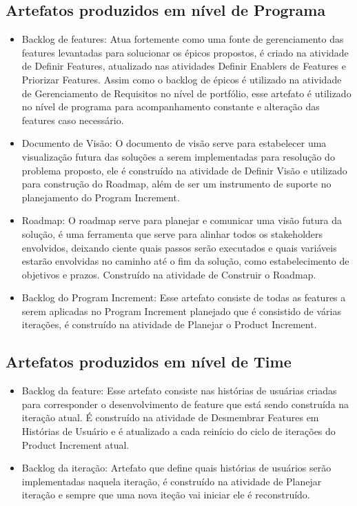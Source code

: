 \subsection{Artefatos produzidos em nível de Programa}
\begin{itemize}
\item Backlog de features: Atua fortemente como uma fonte de gerenciamento das features levantadas para solucionar os épicos propostos, é criado na atividade de Definir Features,
atualizado nas atividades Definir Enablers de Features e Priorizar Features. Assim como o backlog de épicos é utilizado na atividade de Gerenciamento de Requisitos no nível de portfólio, esse artefato é utilizado no nível de programa para acompanhamento constante e alteração das features caso necessário.

\item Documento de Visão: O documento de visão serve para estabelecer uma visualização futura das soluções a serem implementadas para resolução do problema proposto, ele é construído na atividade de Definir Visão e utilizado para construção do Roadmap, além de ser um instrumento de suporte no planejamento do Program Increment.

\item Roadmap: O roadmap serve para planejar e comunicar uma visão futura da solução, é uma ferramenta que serve para alinhar todos os stakeholders envolvidos, deixando ciente quais passos serão executados e quais variáveis estarão envolvidas no caminho até o fim da solução, como estabelecimento de objetivos e prazos. Construído na atividade de Construir o Roadmap.

\item Backlog do Program Increment: Esse artefato consiste de todas as features a serem aplicadas no Program Increment planejado que é consistido de várias iterações, é construído na atividade de Planejar o Product Increment.

\end{itemize}

\subsection{Artefatos produzidos em nível de Time}
\begin{itemize}
\item Backlog da feature: Esse artefato consiste nas histórias de usuárias criadas para corresponder o desenvolvimento de feature que está sendo construída na iteração atual. É construído na atividade de Desmembrar Features em Histórias de Usuário e é atualizado a cada reinício do ciclo de iterações do Product Increment atual.
\item Backlog da iteração: Artefato que define quais histórias de usuários serão implementadas naquela iteração, é construído na atividade de Planejar iteração e sempre que uma nova iteção vai iniciar ele é reconstruído.
\end{itemize}